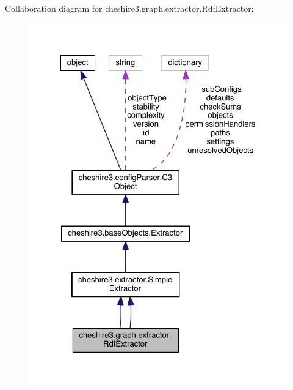 Collaboration diagram for cheshire3.\-graph.\-extractor.\-Rdf\-Extractor\-:
\nopagebreak
\begin{figure}[H]
\begin{center}
\leavevmode
\includegraphics[width=325pt]{classcheshire3_1_1graph_1_1extractor_1_1_rdf_extractor__coll__graph}
\end{center}
\end{figure}
